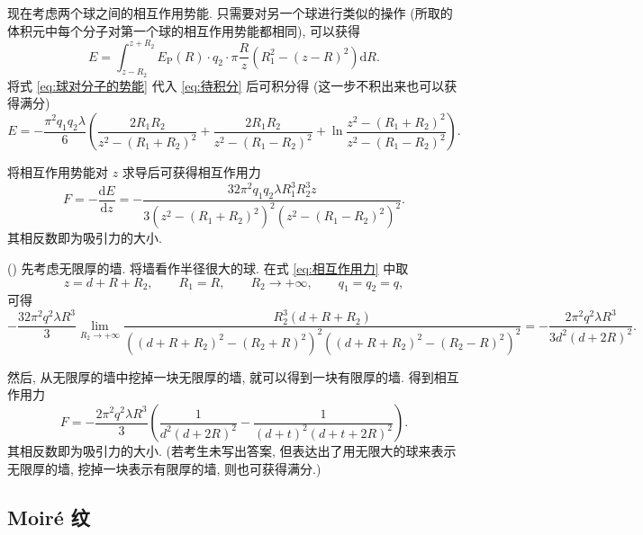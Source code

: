 \documentclass{article}
\newcounter{para}
\newcommand\mypara{\par\refstepcounter{para}(\thepara)\space}
\begin{document}
现在考虑两个球之间的相互作用势能. 只需要对另一个球进行类似的操作
(所取的体积元中每个分子对第一个球的相互作用势能都相同), 可以获得
\begin{equation}
	\label{eq:待积分}
	E=\int_{z-R_2}^{z+R_2}E_\mathrm P\!\left(R\right)\cdot q_2\cdot
	\pi\frac Rz\left(R_1^2-\left(z-R\right)^2\right)\mathrm dR.
\end{equation}
将式 \ref{eq:球对分子的势能} 代入 \ref{eq:待积分} 后可积分得 (这一步不积出来也可以获得满分)
\begin{equation}
	E=-\frac{\pi^2q_1q_2\lambda}6\left(\frac{2R_1R_2}{z^2-\left(R_1+R_2\right)^2}
	+\frac{2R_1R_2}{z^2-\left(R_1-R_2\right)^2}
	+\ln\frac{z^2-\left(R_1+R_2\right)^2}{z^2-\left(R_1-R_2\right)^2}\right).
\end{equation}

将相互作用势能对 $z$ 求导后可获得相互作用力
\begin{equation}
	\label{eq:相互作用力}
	F=-\frac{\mathrm dE}{\mathrm dz}=
	-\frac{32\pi^2q_1q_2\lambda R_1^3R_2^3z}
	{3\left(z^2-\left(R_1+R_2\right)^2\right)^2\left(z^2-\left(R_1-R_2\right)^2\right)^2}.
\end{equation}
其相反数即为吸引力的大小.

\mypara
先考虑无限厚的墙.
将墙看作半径很大的球.
在式 \ref{eq:相互作用力} 中取
\begin{equation}
	z=d+R+R_2,\qquad R_1=R,\qquad R_2\to+\infty,\qquad q_1=q_2=q,
\end{equation}
可得
\begin{equation}
	-\frac{32\pi^2q^2\lambda R^3}3\lim_{R_2\to+\infty}
	\frac{R_2^3\left(d+R+R_2\right)}
	{\left(\left(d+R+R_2\right)^2-\left(R_2+R\right)^2\right)^2
	\left(\left(d+R+R_2\right)^2-\left(R_2-R\right)^2\right)^2}
	=-\frac{2\pi^2q^2\lambda R^3}{3d^2\left(d+2R\right)^2}.
\end{equation}

然后, 从无限厚的墙中挖掉一块无限厚的墙, 就可以得到一块有限厚的墙.
得到相互作用力
\begin{equation}
	F=-\frac{2\pi^2q^2\lambda R^3}{3}\left(\frac1{d^2\left(d+2R\right)^2}
	-\frac1{\left(d+t\right)^2\left(d+t+2R\right)^2}\right).
\end{equation}
其相反数即为吸引力的大小.
(若考生未写出答案, 但表达出了用无限大的球来表示无限厚的墙, 挖掉一块表示有限厚的墙,
则也可获得满分.)

\subsection{Moiré 纹}
\end{document}
